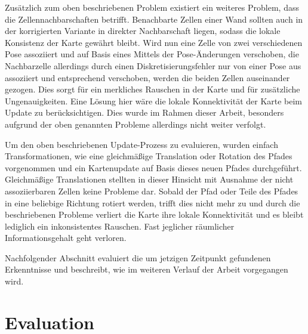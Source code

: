 Zusätzlich zum oben beschriebenen Problem existiert ein weiteres Problem, dass die Zellennachbarschaften betrifft. Benachbarte Zellen einer Wand sollten auch in der korrigierten Variante in direkter Nachbarschaft liegen, sodass die lokale Konsistenz der Karte gewährt bleibt. Wird nun eine Zelle von zwei verschiedenen Pose assoziiert und auf Basis eines Mittels der Pose-Änderungen verschoben, die Nachbarzelle allerdings durch einen Diskretisierungsfehler nur von einer Pose aus assoziiert und entsprechend verschoben, werden die beiden Zellen auseinander gezogen. Dies sorgt für ein merkliches Rauschen in der Karte und für zusätzliche Ungenauigkeiten. Eine Lösung hier wäre die lokale Konnektivität der Karte beim Update zu berücksichtigen. Dies wurde im Rahmen dieser Arbeit, besonders aufgrund der oben genannten Probleme allerdings nicht weiter verfolgt.

Um den oben beschriebenen Update-Prozess zu evaluieren, wurden einfach Transformationen, wie eine gleichmäßige Translation oder Rotation des Pfades vorgenommen und ein Kartenupdate auf Basis dieses neuen Pfades durchgeführt. Gleichmäßige Translationen stellten in dieser Hinsicht mit Ausnahme der nicht assoziierbaren Zellen keine Probleme dar. Sobald der Pfad oder Teile des Pfades in eine beliebige Richtung rotiert werden, trifft dies nicht mehr zu und durch die beschriebenen Probleme verliert die Karte ihre lokale Konnektivität und es bleibt lediglich ein inkonsistentes Rauschen. Fast jeglicher räumlicher Informationsgehalt geht verloren.

Nachfolgender Abschnitt evaluiert die um jetzigen Zeitpunkt gefundenen Erkenntnisse und beschreibt, wie im weiteren Verlauf der Arbeit vorgegangen wird.


\section{Evaluation}

